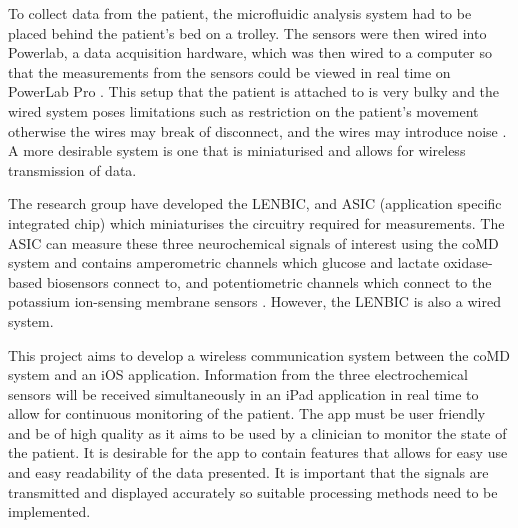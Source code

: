 To collect data from the patient, the microfluidic analysis system had to be placed behind the patient's bed on a trolley. The sensors were then wired into Powerlab, a data acquisition hardware, which was then wired to a computer so that the measurements from the sensors could be viewed in real time on PowerLab Pro \cite{Rogers2017}. This setup that the patient is attached to is very bulky and the wired system poses limitations such as restriction on the patient's movement otherwise the wires may break of disconnect, and the wires may introduce noise \cite{Ferguson2011}. A more desirable system is one that is miniaturised and allows for wireless transmission of data.

The research group have developed the LENBIC, and ASIC (application specific integrated chip) which miniaturises the circuitry required for measurements. The ASIC can measure these three neurochemical signals of interest using the coMD system and contains amperometric channels which glucose and lactate oxidase-based biosensors connect to, and potentiometric channels which connect to the potassium ion-sensing membrane sensors \cite{Pagkalos2017, Rogers2017}. However, the LENBIC is also a wired system. 

This project aims to develop a wireless communication system between the coMD system and an iOS application. Information from the three electrochemical sensors will be received simultaneously in an iPad application in real time to allow for continuous monitoring of the patient. The app must be user friendly and be of high quality as it aims to be used by a clinician to monitor the state of the patient. It is desirable for the app to contain features that allows for easy use and easy readability of the data presented. It is important that the signals are transmitted and displayed accurately so suitable processing methods need to be implemented. 

